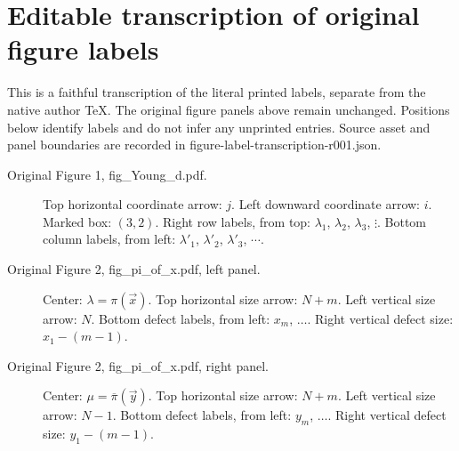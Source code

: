 \documentclass[11pt]{article}
\numberwithin{equation}{section}
\numberwithin{equation}{section}
\begin{document}
\section*{Editable transcription of original figure labels}
\noindent This is a faithful transcription of the literal printed labels, separate from the native author TeX. The original figure panels above remain unchanged. Positions below identify labels and do not infer any unprinted entries. Source asset and panel boundaries are recorded in figure-label-transcription-r001.json.
\begin{description}
\item[Original Figure 1, fig\_Young\_d.pdf.] Top horizontal coordinate arrow: $j$. Left downward coordinate arrow: $i$. Marked box: $(3,2)$. Right row labels, from top: $\lambda_1$, $\lambda_2$, $\lambda_3$, $\vdots$. Bottom column labels, from left: $\lambda'_1$, $\lambda'_2$, $\lambda'_3$, $\cdots$.
\item[Original Figure 2, fig\_pi\_of\_x.pdf, left panel.] Center: $\lambda=\pi(\vec{x})$. Top horizontal size arrow: $N+m$. Left vertical size arrow: $N$. Bottom defect labels, from left: $x_m$, $\ldots$. Right vertical defect size: $x_1-(m-1)$.
\item[Original Figure 2, fig\_pi\_of\_x.pdf, right panel.] Center: $\mu=\overline{\pi}(\vec{y})$. Top horizontal size arrow: $N+m$. Left vertical size arrow: $N-1$. Bottom defect labels, from left: $y_m$, $\ldots$. Right vertical defect size: $y_1-(m-1)$.
\end{description}
\end{document}
